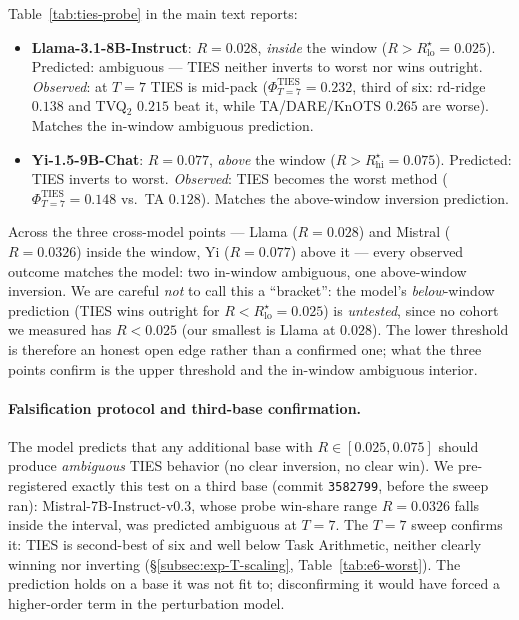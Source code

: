 Table~\ref{tab:ties-probe} in the main text reports:
\begin{itemize}
\item \textbf{Llama-3.1-8B-Instruct}: $R = 0.028$, \emph{inside} the
  window ($R > R^\star_{\mathrm{lo}} = 0.025$). Predicted: ambiguous
  --- TIES neither inverts to worst nor wins outright.
  \emph{Observed}: at $T = 7$ TIES is mid-pack
  ($\Phi^{\mathrm{TIES}}_{T=7} = 0.232$, third of six: rd-ridge
  $0.138$ and TVQ$_2$ $0.215$ beat it, while TA/DARE/KnOTS $0.265$ are
  worse). Matches the in-window ambiguous prediction.
\item \textbf{Yi-1.5-9B-Chat}: $R = 0.077$, \emph{above} the window
  ($R > R^\star_{\mathrm{hi}} = 0.075$). Predicted: TIES inverts to
  worst. \emph{Observed}: TIES
  becomes the worst method ($\Phi^{\mathrm{TIES}}_{T=7} = 0.148$ vs.\ TA
  $0.128$). Matches the above-window inversion prediction.
\end{itemize}
Across the three cross-model points --- Llama ($R = 0.028$) and
Mistral ($R = 0.0326$) inside the window, Yi ($R = 0.077$) above it
--- every observed outcome matches the model: two in-window ambiguous,
one above-window inversion. We are careful \emph{not} to call this a
``bracket'': the model's \emph{below}-window prediction (TIES wins
outright for $R < R^\star_{\mathrm{lo}} = 0.025$) is \emph{untested},
since no cohort we measured has $R < 0.025$ (our smallest is Llama at
$0.028$). The lower threshold is therefore an honest open edge rather
than a confirmed one; what the three points confirm is the upper
threshold and the in-window ambiguous interior.

\paragraph{Falsification protocol and third-base confirmation.}
The model predicts that any additional base with $R \in [0.025,
0.075]$ should produce \emph{ambiguous} TIES behavior (no clear
inversion, no clear win). We pre-registered exactly this test on a
third base (commit \texttt{3582799}, before the sweep ran):
Mistral-7B-Instruct-v0.3, whose probe win-share range $R = 0.0326$ falls
inside the interval, was predicted ambiguous at $T = 7$. The $T = 7$
sweep confirms it: TIES is second-best of six and well below Task
Arithmetic, neither clearly winning nor inverting
(\S\ref{subsec:exp-T-scaling}, Table~\ref{tab:e6-worst}). The prediction
holds on a base it was not fit to; disconfirming it would have forced a
higher-order term in the perturbation model.

